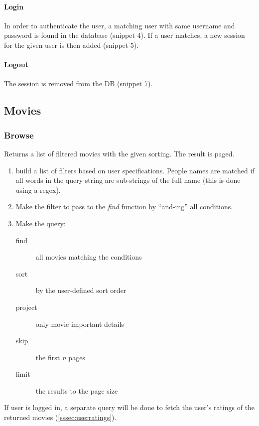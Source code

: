 \documentclass[11pt]{article}
\begin{document}
\paragraph{Login}
In order to authenticate the user, a matching user with same username and password is found in the database (snippet 4). If a user matches, a new session
for the given user is then added (snippet 5).

\paragraph{Logout}
The session is removed from the DB (snippet 7).



\subsection{Movies}
\subsubsection{Browse}
Returns a list of filtered movies with the given sorting. The result is paged.

\begin{enumerate}
	\item build a list of filters based on user specifications. People names are
			matched if all words in the query string are sub-strings of the full 
			name (this is done using a regex).
	\item Make the filter to pass to the \emph{find} function by ``and-ing'' all 
			conditions.
	\item Make the query:
		\begin{description}
			\item[find] all movies matching the conditions
			\item[sort] by the user-defined sort order
			\item[project] only movie important details
			\item[skip] the first \emph{n} pages
			\item[limit] the results to the page size
		\end{description}
\end{enumerate}

If user is logged in, a separate query will be done to fetch the user's ratings of the returned movies (\ref{sssec:userratings}).


\end{document}
